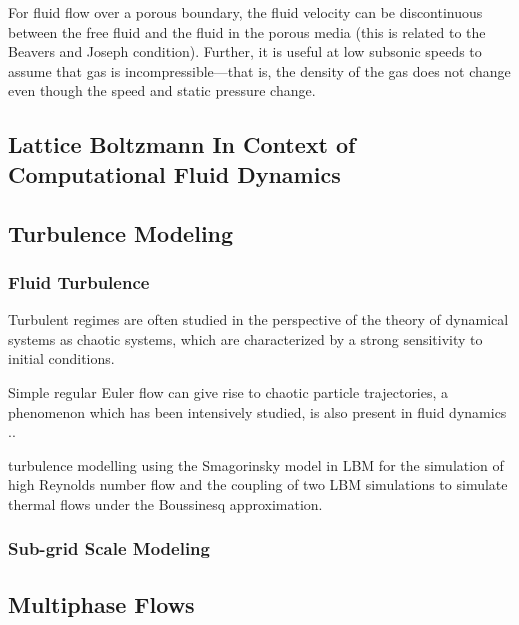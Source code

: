 For fluid flow over a porous boundary, the fluid velocity can be discontinuous between the free fluid and the fluid in the porous media (this is related to the Beavers and Joseph condition). Further, it is useful at low subsonic speeds to assume that gas is incompressible—that is, the density of the gas does not change even though the speed and static pressure change.


\subsection{Lattice Boltzmann In Context of Computational Fluid Dynamics}





\subsection{Turbulence Modeling}


\subsubsection{Fluid Turbulence}

Turbulent regimes are often studied in the perspective of the theory of dynamical systems as chaotic systems, which are characterized by a strong sensitivity to
initial conditions.

Simple regular Euler flow can give rise to chaotic particle trajectories, a phenomenon which has been intensively studied, is also present in fluid dynamics ..

turbulence modelling using the Smagorinsky model in LBM for the simulation of high Reynolds number flow and the coupling of two LBM simulations to simulate thermal flows under the Boussinesq approximation.

\subsubsection{Sub-grid Scale Modeling}

\subsection{Multiphase Flows}

